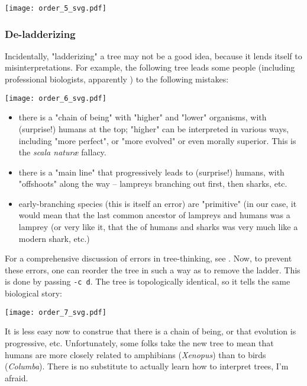 
\begin{center}
\texttt{[image: order\_5\_svg.pdf]}
\end{center}

\subsubsection{De-ladderizing}

Incidentally, "ladderizing" a tree may not be a good idea, because it lends
itself to misinterpretations. For example, the following tree leads some people
(including professional biologists, apparently \cite{Baum_2005}) to the
following mistakes:

\begin{center}
\texttt{[image: order\_6\_svg.pdf]}
\end{center}
\begin{itemize}
	\item there is a "chain of being" with "higher" and "lower" organisms, with (surprise!) humans at the top; "higher" can be interpreted in various ways, including "more perfect", or "more evolved" or even morally superior. This is the \textit{scala natur\ae} fallacy.
	\item there is a "main line" that progressively leads to (surprise!) humans, with "offshoots" along the way -- lampreys branching out first, then sharks, etc. 
	\item early-branching species (this is itself an error) are "primitive" (in our case, it would mean that the last common ancestor of lampreys and humans was a lamprey (or very like it, that the \lca{} of humans and sharks was very much like a modern shark, etc.)
\end{itemize}
For a comprehensive discussion of errors in tree-thinking, see
\cite{Gregory_2008}.  Now, to prevent these errors, one can reorder the tree in
such a way as to remove the ladder. This is done by passing \texttt{-c d}. The
tree is topologically identical, so it tells the same biological story:


\begin{center}
\texttt{[image: order\_7\_svg.pdf]}
\end{center}

\noindent{}It is less easy now to construe that there is a chain of being, or that evolution is progressive, etc. Unfortunately, some folks take the new tree to mean that humans are more closely related to amphibians (\textit{Xenopus}) than to birds (\textit{Columba}). There is no substitute to actually learn how to interpret trees, I'm afraid. 

